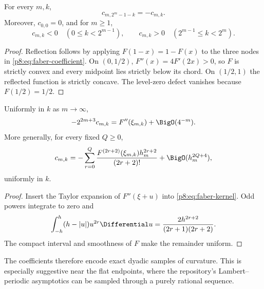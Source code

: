 \documentclass[11pt]{article}
\theoremstyle{definition}
\theoremstyle{remark}
\begin{document}
\begin{proposition}
\label{p8:prop:faber-sign}
For every $m,k$,
\begin{equation}
 c_{m,2^m-1-k}=-c_{m,k}.                                 \label{p8:eq:faber-reflection}
\end{equation}
Moreover, $c_{0,0}=0$, and for $m\ge1$,
\begin{equation}
 c_{m,k}<0\quad(0\le k<2^{m-1}),
 \qquad
 c_{m,k}>0\quad(2^{m-1}\le k<2^m).                     \label{p8:eq:faber-sign}
\end{equation}
\end{proposition}

\begin{proof}
Reflection follows by applying $F(1-x)=1-F(x)$ to the three nodes in
\eqref{p8:eq:faber-coefficient}.  On $(0,1/2)$,
$F''(x)=4F'(2x)>0$, so $F$ is strictly convex and every midpoint lies strictly
below its chord.  On $(1/2,1)$ the reflected function is strictly concave.
The level-zero defect vanishes because $F(1/2)=1/2$.
\end{proof}

\begin{proposition}
\label{p8:prop:faber-curvature}
Uniformly in $k$ as $m\to\infty$,
\begin{equation}
 -2^{2m+3}c_{m,k}
 =F''(\xi_{m,k})+\BigO(4^{-m}).                          \label{p8:eq:faber-curvature}
\end{equation}
More generally, for every fixed $Q\ge0$,
\begin{equation}
 c_{m,k}=-\sum_{r=0}^{Q}
 \frac{F^{(2r+2)}(\xi_{m,k})h_m^{2r+2}}{(2r+2)!}
 +\BigO(h_m^{2Q+4}),                                     \label{p8:eq:faber-curvature-full}
\end{equation}
uniformly in $k$.
\end{proposition}

\begin{proof}
Insert the Taylor expansion of $F''(\xi+u)$ into
\eqref{p8:eq:faber-kernel}.  Odd powers integrate to zero and
\[
 \int_{-h}^{h}(h-|u|)u^{2r}\Differential u
 =\frac{2h^{2r+2}}{(2r+1)(2r+2)}.
\]
The compact interval and smoothness of $F$ make the remainder uniform.
\end{proof}

The coefficients therefore encode exact dyadic samples of curvature.  This
is especially suggestive near the flat endpoints, where the repository's
Lambert--periodic asymptotics can be sampled through a purely rational
sequence.
\end{document}
